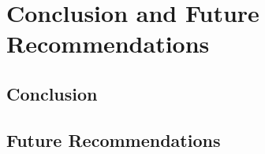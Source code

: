 \chapter{Conclusion and Future Recommendations}
\section{Conclusion}
\lipsum[1]
\section{Future Recommendations}
\lipsum[1]
